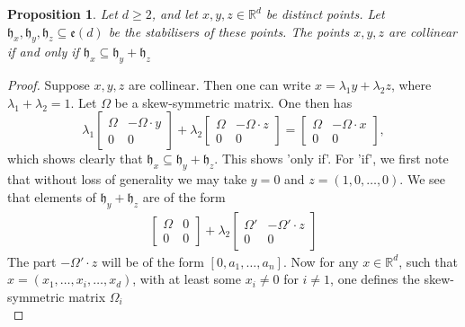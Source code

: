 \documentclass{article}
\newtheorem{proposition}[theorem]{Proposition}
\theoremstyle{definition}
\theoremstyle{remark}
\begin{document}
\begin{proposition}\label{prop: collinear}
Let $d\geq 2$, and let $x,y,z\in \mathbb{R}^{d}$ be distinct points. Let $\mathfrak{h}_x, \mathfrak{h}_y, \mathfrak{h}_z \subseteq \mathfrak{e}(d)$ be the stabilisers of these points. The points $x,y,z$ are collinear if and only if $\mathfrak{h}_x \subseteq \mathfrak{h}_y + \mathfrak{h}_z$
\end{proposition}
\begin{proof}
    Suppose $x,y,z$ are collinear. Then one can write $x= \lambda_1 y + \lambda_2 z$, where $\lambda_1 + \lambda_2 =1$. Let $\Omega$ be a skew-symmetric matrix. One then has
    \begin{equation*}
     \lambda_1
        \begin{bmatrix}
           \Omega  &  - \Omega \cdot y\\
            0 & 0
        \end{bmatrix}+  \lambda_2
        \begin{bmatrix}
           \Omega  &  - \Omega \cdot z\\
            0 & 0
        \end{bmatrix}
        =         \begin{bmatrix}
           \Omega  &  - \Omega \cdot x\\
            0 & 0
        \end{bmatrix},
    \end{equation*}
    which shows clearly that $\mathfrak{h}_x \subseteq \mathfrak{h}_y +\mathfrak{h}_z$. This shows 'only if'. For 'if', we first note that without loss of generality we may take $y=0$ and $z=(1, 0, \dots, 0).$ We see that elements of $\mathfrak{h}_y +\mathfrak{h}_z$ are of the form
    \begin{align*}
     \begin{bmatrix}
           \Omega  & 0\\
            0 & 0
        \end{bmatrix}+  \lambda_2
        \begin{bmatrix}
           \Omega'  &  - \Omega' \cdot z\\
            0 & 0
        \end{bmatrix}
    \end{align*}
    The part $- \Omega' \cdot z$ will be of the form $[0, a_1, \dots, a_{n}]$. Now for any $x\in \mathbb{R}^{d}$, such that $x =(x_1, \dots, x_i, \dots, x_d)$, with at least some $x_i \neq 0$ for $i\neq 1$, one defines the skew-symmetric matrix $\Omega_i$
    \begin{equation*}

\end{equation*}
\end{proof}
\end{document}
